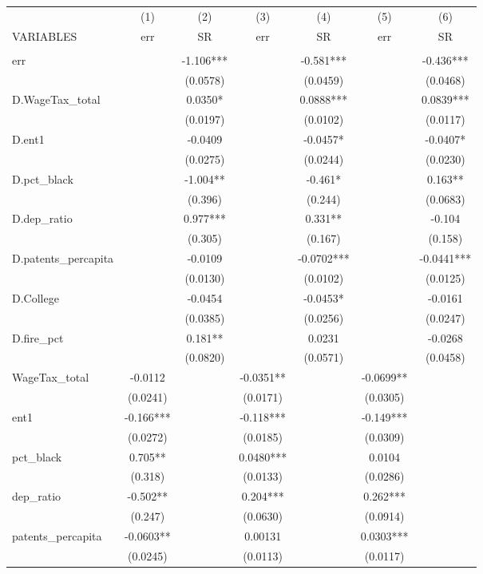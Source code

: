 \begin{tabular}{lcccccc} \hline
 & (1) & (2) & (3) & (4) & (5) & (6) \\
VARIABLES & err & SR & err & SR & err & SR \\ \hline
 &  &  &  &  &  &  \\
err &  & -1.106*** &  & -0.581*** &  & -0.436*** \\
 &  & (0.0578) &  & (0.0459) &  & (0.0468) \\
D.WageTax\_total &  & 0.0350* &  & 0.0888*** &  & 0.0839*** \\
 &  & (0.0197) &  & (0.0102) &  & (0.0117) \\
D.ent1 &  & -0.0409 &  & -0.0457* &  & -0.0407* \\
 &  & (0.0275) &  & (0.0244) &  & (0.0230) \\
D.pct\_black &  & -1.004** &  & -0.461* &  & 0.163** \\
 &  & (0.396) &  & (0.244) &  & (0.0683) \\
D.dep\_ratio &  & 0.977*** &  & 0.331** &  & -0.104 \\
 &  & (0.305) &  & (0.167) &  & (0.158) \\
D.patents\_percapita &  & -0.0109 &  & -0.0702*** &  & -0.0441*** \\
 &  & (0.0130) &  & (0.0102) &  & (0.0125) \\
D.College &  & -0.0454 &  & -0.0453* &  & -0.0161 \\
 &  & (0.0385) &  & (0.0256) &  & (0.0247) \\
D.fire\_pct &  & 0.181** &  & 0.0231 &  & -0.0268 \\
 &  & (0.0820) &  & (0.0571) &  & (0.0458) \\
WageTax\_total & -0.0112 &  & -0.0351** &  & -0.0699** &  \\
 & (0.0241) &  & (0.0171) &  & (0.0305) &  \\
ent1 & -0.166*** &  & -0.118*** &  & -0.149*** &  \\
 & (0.0272) &  & (0.0185) &  & (0.0309) &  \\
pct\_black & 0.705** &  & 0.0480*** &  & 0.0104 &  \\
 & (0.318) &  & (0.0133) &  & (0.0286) &  \\
dep\_ratio & -0.502** &  & 0.204*** &  & 0.262*** &  \\
 & (0.247) &  & (0.0630) &  & (0.0914) &  \\
patents\_percapita & -0.0603** &  & 0.00131 &  & 0.0303*** &  \\
 & (0.0245) &  & (0.0113) &  & (0.0117) &  \\

\end{tabular}
